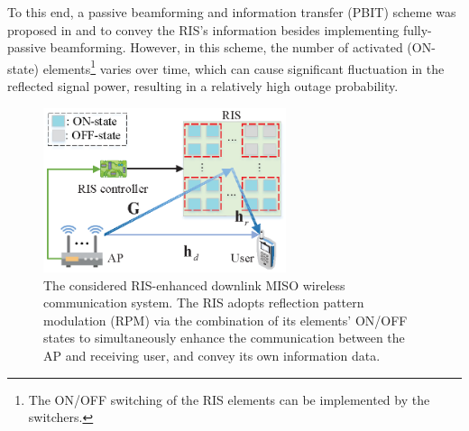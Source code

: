 \documentclass[draftclsnofoot,onecolumn,12pt]{IEEEtran}
\begin{document}
To this end, a passive beamforming and information transfer (PBIT) scheme was proposed in \cite{yan2019pbit} and \cite{yan2019pbit2} to convey the RIS's information besides implementing fully-passive beamforming. 
However, in this scheme, the number of activated (ON-state) elements\footnote{The ON/OFF switching of the RIS elements can be implemented by the switchers.} varies over time, which can cause significant fluctuation in the reflected signal power, resulting in a relatively high outage probability. 


\begin{figure}[!t]
	\centering
	\includegraphics[width=2.8in]{system.eps}
	\caption{The considered RIS-enhanced downlink MISO wireless communication system. The RIS adopts reflection pattern modulation (RPM) via the combination of its elements' ON/OFF states to simultaneously enhance the communication between the AP and receiving user, and convey its own information data.} 
	\label{system}
\end{figure}
\end{document}
